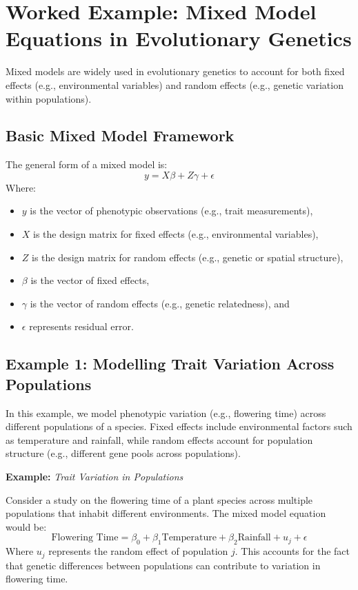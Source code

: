 \documentclass[12pt,a4paper]{article}
\newenvironment{example}[1][]
{\begin{basebox}[linecolor=uqgold]
\textbf{\color{uqgold}Example:} \textit{#1}\par\noindent\ignorespaces}
{\end{basebox}}
\begin{document}
\section{Worked Example: Mixed Model Equations in Evolutionary Genetics}

Mixed models are widely used in evolutionary genetics to account for both fixed effects (e.g., environmental variables) and random effects (e.g., genetic variation within populations).

\subsection{Basic Mixed Model Framework}

The general form of a mixed model is:
\[
y = X\beta + Z\gamma + \epsilon
\]
Where:
\begin{itemize}
    \item \( y \) is the vector of phenotypic observations (e.g., trait measurements),
    \item \( X \) is the design matrix for fixed effects (e.g., environmental variables),
    \item \( Z \) is the design matrix for random effects (e.g., genetic or spatial structure),
    \item \( \beta \) is the vector of fixed effects,
    \item \( \gamma \) is the vector of random effects (e.g., genetic relatedness), and
    \item \( \epsilon \) represents residual error.
\end{itemize}

\subsection{Example 1: Modelling Trait Variation Across Populations}

In this example, we model phenotypic variation (e.g., flowering time) across different populations of a species. Fixed effects include environmental factors such as temperature and rainfall, while random effects account for population structure (e.g., different gene pools across populations).

\begin{example}[Trait Variation in Populations]
Consider a study on the flowering time of a plant species across multiple populations that inhabit different environments. The mixed model equation would be:
\[
\text{Flowering Time} = \beta_0 + \beta_1 \text{Temperature} + \beta_2 \text{Rainfall} + u_j + \epsilon
\]
Where \( u_j \) represents the random effect of population \( j \). This accounts for the fact that genetic differences between populations can contribute to variation in flowering time.
\end{example}
\end{document}
